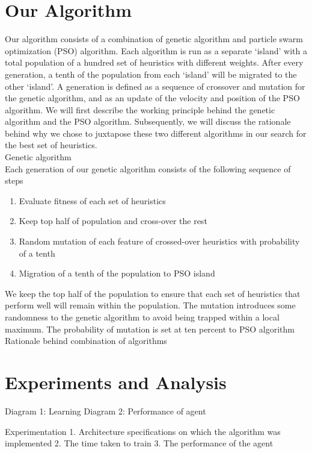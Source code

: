 \documentclass{article}
\begin{document}
    \section{Our Algorithm}

    Our algorithm consists of a combination of genetic algorithm and particle swarm
	optimization (PSO) algorithm. Each algorithm is run as a separate ‘island’ with
	a total population of a hundred set of heuristics with different weights.
	After every generation, a tenth of the population from each ‘island’ will be
	migrated to the other ‘island’. A generation is defined as a sequence of crossover
	and mutation for the genetic algorithm, and as an update of the velocity and
	position of the PSO algorithm. We will first describe the working principle
	behind the genetic algorithm and the PSO algorithm. Subsequently, we will
	discuss the rationale behind why we chose to juxtapose these two different
	algorithms in our search for the best set of heuristics.\\

	Genetic algorithm\\
	Each generation of our genetic algorithm consists of the following sequence of steps
	\begin{enumerate}
		\item Evaluate fitness of each set of heuristics
		\item Keep top half of population and cross-over the rest
		\item Random mutation of each feature of crossed-over heuristics with probability of a tenth
		\item Migration of a tenth of the population to PSO island
	\end{enumerate}
	We keep the top half of the population to ensure that each set of heuristics that perform well will remain within the population. The mutation introduces some randomness to the genetic algorithm to avoid being trapped within a local maximum. The probability of mutation is set at ten percent to
	PSO algorithm\\

	Rationale behind combination of algorithms

    \section{Experiments and Analysis}

    Diagram 1: Learning
    Diagram 2: Performance of agent

    Experimentation
        1. Architecture specifications on which the algorithm was implemented
        2. The time taken to train
        3. The performance of the agent
\end{document}
